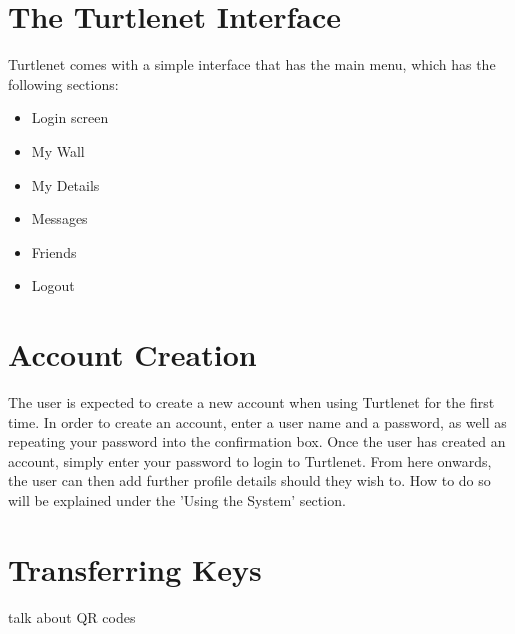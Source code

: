 \section{The Turtlenet Interface}
Turtlenet comes with a simple interface that has the main menu, which has the
following sections:
\begin{itemize}
\item Login screen
\item My Wall
\item My Details
\item Messages
\item Friends
\item Logout
\end{itemize}

\section{Account Creation}
The user is expected to create a new account when using Turtlenet for the first
time.  In order to create an account, enter a user name and a password, as well
as repeating your password into the confirmation box.  Once the user has 
created an account, simply enter your password to login to Turtlenet.  From here
onwards, the user can then add further profile details should they wish to.  
How to do so will be explained under the 'Using the System' section.

\section{Transferring Keys}
talk about QR codes